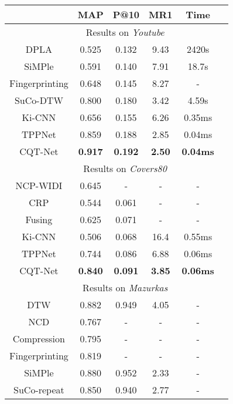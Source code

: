 \documentclass{article}
\begin{document}
 \begin{table}[H]
  \small
  \centering
  \label{tab:com}
  \begin{tabular}{cccccc}
      \toprule
      & MAP & P@10 & MR1 & Time  \\ 
      \midrule
      &\multicolumn{3}{c}{Results on \textit{Youtube}} \\
      \hline
      DPLA \cite{serra2008chroma} & 0.525 & 0.132 & 9.43 & 2420s  \\ 
      SiMPle \cite{silva2016simple} & 0.591 & 0.140 & 7.91 & 18.7s \\ 
      Fingerprinting \cite{Seetharaman2017CoverSI} & 0.648 & 0.145 & 8.27 & -  \\
      SuCo-DTW \cite{silva2018summarizing}& 0.800 & 0.180 & 3.42 & 4.59s \\
      Ki-CNN \cite{xu2018key}& 0.656 & 0.155 & 6.26 & 0.35ms \\
      TPPNet \cite{yu2019temporal}& 0.859 & 0.188 & 2.85 & 0.04ms \\
      CQT-Net & \textbf{0.917} & \textbf{0.192} & \textbf{2.50} & \textbf{0.04ms} \\
      \hline
      &\multicolumn{3}{c}{Results on \textit{Covers80}} \\
      \hline
      NCP-WIDI \cite{cheng2017effective} &0.645 & - & - &-\\
      CRP \cite{serra2009cross} & 0.544 & 0.061 & - &-\\
      Fusing \cite{chen2018fusing} & 0.625 & 0.071 & - & - \\
      Ki-CNN \cite{xu2018key}& 0.506 & 0.068 & 16.4 & 0.55ms \\
      TPPNet \cite{yu2019temporal}& 0.744 & 0.086 & 6.88 & 0.06ms \\
      CQT-Net & \textbf{0.840} & \textbf{0.091} & \textbf{3.85} & \textbf{0.06ms} \\ 
      \hline
      &\multicolumn{3}{c}{Results on \textit{Mazurkas}} \\
      \hline
      DTW \cite{silva2016simple} & 0.882 & 0.949 & 4.05 & - \\
      NCD \cite{bello2011measuring} & 0.767 & - & - & - \\
      Compression \cite{silva2013video} & 0.795 & - & - & - \\
      Fingerprinting \cite{grosche2012structure} & 0.819 & - & - & - \\
      SiMPle \cite{silva2016simple} & 0.880 & 0.952 & 2.33 & - \\
      SuCo-repeat \cite{silva2018summarizing} & 0.850 & 0.940 & 2.77 & - \\

\end{tabular}
\end{table}
\end{document}
